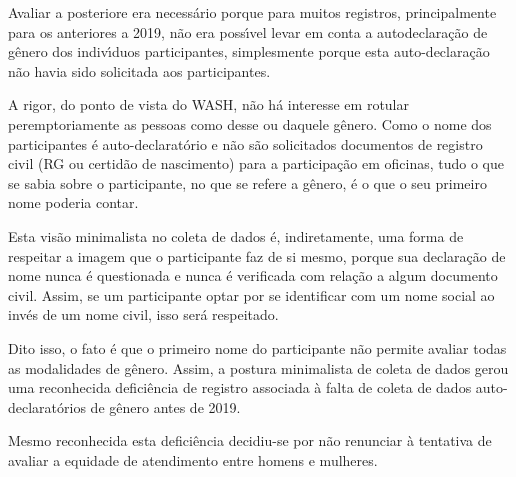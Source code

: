 \documentclass[
12pt,		%
openright,	%
twoside,  %
a4paper,			%
chapter=TITLE,		%
english,			%
french,				%
spanish,			%
brazil				%
]{USPSC-classe/USPSC_RedarTex}
\begin{document}
Avaliar a posteriore era necess\'ario porque para muitos registros, principalmente para os anteriores a 2019, n\~ao era poss\'{\i}vel levar em conta a autodeclara\c{c}\~ao de g\^enero dos indiv\'{\i}duos participantes, simplesmente porque esta auto-declara\c{c}\~ao n\~ao havia sido solicitada aos participantes.










A rigor, do ponto de vista do WASH, n\~ao h\'a interesse em rotular peremptoriamente as pessoas como desse ou daquele g\^enero. Como o nome dos participantes \'e auto-declarat\'orio e n\~ao s\~ao solicitados documentos de registro civil (RG ou certid\~ao de nascimento) para a participa\c{c}\~ao em oficinas, tudo o que se sabia sobre o participante, no que se refere a g\^enero, \'e o que o seu primeiro nome poderia contar.










Esta vis\~ao minimalista no coleta de dados \'e, indiretamente, uma forma de respeitar a imagem que o participante faz de si mesmo, porque sua declara\c{c}\~ao de nome nunca \'e questionada e nunca \'e verificada com rela\c{c}\~ao a algum documento civil. Assim, se um participante optar por se identificar com um nome social ao inv\'es de um nome civil, isso ser\'a respeitado.










Dito isso, o fato \'e que o primeiro nome do participante n\~ao permite avaliar todas as modalidades de g\^enero. Assim, a postura minimalista de coleta de dados gerou uma reconhecida defici\^encia de registro associada \`a falta de coleta de dados auto-declarat\'orios de g\^enero antes de 2019.










Mesmo reconhecida esta defici\^encia decidiu-se por n\~ao renunciar \`a tentativa de avaliar a equidade de atendimento entre homens e mulheres.
\end{document}
